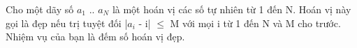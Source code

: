 Cho một dãy số $a_{1}$   .. $a_{N}$   là một hoán vị các số tự nhiên từ 1 đến N. Hoán vị này gọi là đẹp nếu trị tuyệt đối |$a_{i}$   - i|  $\le$  M với mọi i từ 1 đến N và M cho trước. Nhiệm vụ của bạn là đếm số hoán vị đẹp.